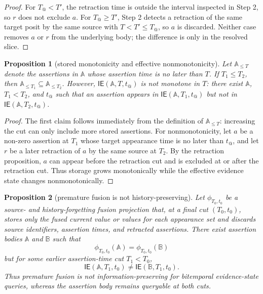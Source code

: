 \documentclass[a4paper,fleqn]{cas-sc}
\newcommand{\ie}{\mathsf{IE}}
\theoremstyle{plain}
\newtheorem{proposition}{Proposition}
\theoremstyle{remark}
\begin{document}
\begin{proof}
For \(T_@<T'\), the retraction time is outside the interval inspected in Step 2, so \(r\) does not exclude \(a\). For \(T_@\geq T'\), Step 2 detects a retraction of the same target posit by the same source with \(T<T'\leq T_@\), so \(a\) is discarded. Neither case removes \(a\) or \(r\) from the underlying body; the difference is only in the resolved slice.
\end{proof}

\begin{proposition}[stored monotonicity and effective nonmonotonicity]
\label{Prop:effective-nonmonotonicity}
Let \(\mathbb{A}_{\leq T}\) denote the assertions in \(\mathbb{A}\) whose assertion time is no later than \(T\). If \(T_1\leq T_2\), then \(\mathbb{A}_{\leq T_1}\subseteq \mathbb{A}_{\leq T_2}\). However, \(\ie(\mathbb{A},T,t_@)\) is not monotone in \(T\): there exist \(\mathbb{A}\), \(T_1<T_2\), and \(t_@\) such that an assertion appears in \(\ie(\mathbb{A},T_1,t_@)\) but not in \(\ie(\mathbb{A},T_2,t_@)\).
\end{proposition}

\begin{proof}
The first claim follows immediately from the definition of \(\mathbb{A}_{\leq T}\): increasing the cut can only include more stored assertions. For nonmonotonicity, let \(a\) be a non-zero assertion at \(T_1\) whose target appearance time is no later than \(t_@\), and let \(r\) be a later retraction of \(a\) by the same source at \(T_2\). By the retraction proposition, \(a\) can appear before the retraction cut and is excluded at or after the retraction cut. Thus storage grows monotonically while the effective evidence state changes nonmonotonically.
\end{proof}

\begin{proposition}[premature fusion is not history-preserving]
\label{Prop:fusion-loss}
Let \(\phi_{T_0,t_0}\) be a source- and history-forgetting fusion projection that, at a final cut \((T_0,t_0)\), stores only the fused current value or values for each appearance set and discards source identifiers, assertion times, and retracted assertions. There exist assertion bodies \(\mathbb{A}\) and \(\mathbb{B}\) such that
\[
\phi_{T_0,t_0}(\mathbb{A})=\phi_{T_0,t_0}(\mathbb{B})
\]
but for some earlier assertion-time cut \(T_1<T_0\),
\[
\ie(\mathbb{A},T_1,t_0)\neq\ie(\mathbb{B},T_1,t_0).
\]
Thus premature fusion is not information-preserving for bitemporal evidence-state queries, whereas the assertion body remains queryable at both cuts.
\end{proposition}
\end{document}
